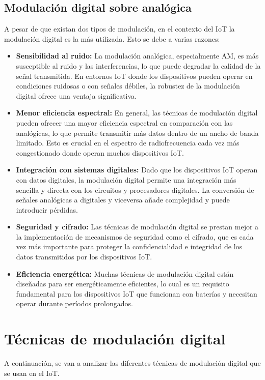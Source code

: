 \documentclass[12pt, letterpaper]{article}
\begin{document}
\subsection{Modulación digital sobre analógica}
A pesar de que existan dos tipos de modulación, en el contexto del IoT la modulación digital es la más utilizada. Esto se debe a varias razones:
\begin{itemize}
    \item \textbf{Sensibilidad al ruido:} La modulación analógica, especialmente AM, es más susceptible al ruido y las interferencias, lo que puede degradar la calidad de la señal transmitida. En entornos IoT donde los dispositivos pueden operar en condiciones ruidosas o con señales débiles, la robustez de la modulación digital ofrece una ventaja significativa.
    \item \textbf{Menor eficiencia espectral:} En general, las técnicas de modulación digital pueden ofrecer una mayor eficiencia espectral en comparación con las analógicas, lo que permite transmitir más datos dentro de un ancho de banda limitado. Esto es crucial en el espectro de radiofrecuencia cada vez más congestionado donde operan muchos dispositivos IoT.
    \item \textbf{Integración con sistemas digitales:} Dado que los dispositivos IoT operan con datos digitales, la modulación digital permite una integración más sencilla y directa con los circuitos y procesadores digitales. La conversión de señales analógicas a digitales y viceversa añade complejidad y puede introducir pérdidas.
    \item \textbf{Seguridad y cifrado:} Las técnicas de modulación digital se prestan mejor a la implementación de mecanismos de seguridad como el cifrado, que es cada vez más importante para proteger la confidencialidad e integridad de los datos transmitidos por los dispositivos IoT.
    \item \textbf{Eficiencia energética:} Muchas técnicas de modulación digital están diseñadas para ser energéticamente eficientes, lo cual es un requisito fundamental para los dispositivos IoT que funcionan con baterías y necesitan operar durante períodos prolongados.
\end{itemize}

\vspace{1em}
\section{Técnicas de modulación digital}
A continuación, se van a analizar las diferentes técnicas de modulación digital que se usan en el IoT.
\end{document}
